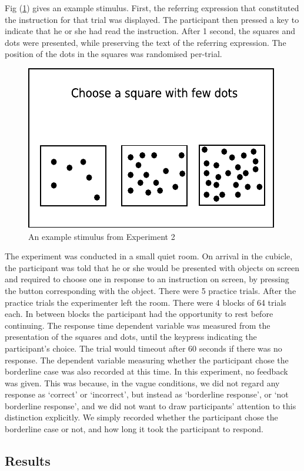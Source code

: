 Fig (\ref{stimuluse2}) gives an example stimulus. First, the referring expression that constituted the instruction for that trial was displayed. The participant then pressed a key to indicate that he or she had read the instruction. After 1 second,  the squares and dots were presented, while preserving the text of the referring expression. The position of the dots in the squares was randomised per-trial.

\begin{figure}[tbp]
\centering
\includegraphics[width=.4\textwidth]{images/stimuluse2}
\caption{An example stimulus from Experiment 2}
\label{stimuluse2}
\end{figure}

The experiment was conducted in a small quiet room.
On arrival in the cubicle, the participant was told that he or she would be presented with objects on screen and required to choose one in response to an instruction on screen, by pressing the button corresponding with the object. There were 5 practice trials. After the practice trials the experimenter left the room. There were 4 blocks of 64 trials each. In between blocks the participant had the opportunity to rest before continuing. The response time dependent variable was measured from the presentation of the squares and dots, until the keypress indicating the participant's choice. The trial would timeout after 60 seconds if there was no response. The dependent variable measuring whether the participant chose the borderline case was also recorded at this time. In this experiment, no feedback was given. This was because, in the vague conditions, we did not regard any response as `correct' or `incorrect', but instead as `borderline response', or `not borderline response', and we did not want to draw participants' attention to this distinction explicitly. We simply recorded whether the participant chose the borderline case or not, and how long it took the participant to respond.

\subsection{Results}

